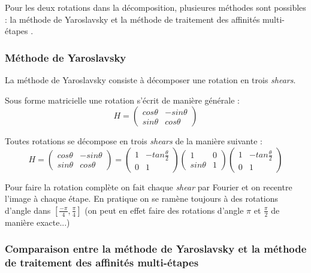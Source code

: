 
Pour les deux rotations dans la décomposition, plusieures méthodes sont possibles : la méthode de Yaroslavsky \cite{unser1995convolution} et la méthode de traitement des affinités multi-étapes \cite{szeliski2010high}.

\subsubsection{Méthode de Yaroslavsky}

La méthode de Yaroslavsky consiste à décomposer une rotation en trois \emph{shears}.

Sous forme matricielle une rotation s'écrit de manière générale :
\begin{equation*}
	H=\begin{pmatrix}
	cos \theta&-sin \theta\\sin \theta&cos \theta
	\end{pmatrix}
	\end{equation*}
\begin{prop}
Toutes rotations se décompose en trois \emph{shears} de la manière suivante :
\begin{equation*}
	H=\begin{pmatrix}
	cos \theta&-sin \theta\\sin \theta&cos \theta
	\end{pmatrix}=\begin{pmatrix}
	1&-tan \frac{\theta}{2}\\0&1
	\end{pmatrix}\begin{pmatrix}
	1&0\\sin \theta&1
	\end{pmatrix}\begin{pmatrix}
	1&-tan \frac{\theta}{2}\\0&1
	\end{pmatrix}
	\end{equation*}
\end{prop}

	Pour faire la rotation complète on fait chaque \emph{shear} par Fourier et on recentre l'image à chaque étape.
	En pratique on se ramène toujours à des rotations d'angle dans $[\frac{-\pi}{4},\frac{\pi}{4}]$ (on peut en effet faire des rotations d'angle $\pi$ et $\frac{\pi}{2}$ de manière exacte...)  


\subsubsection{Comparaison entre la méthode de Yaroslavsky et la méthode de traitement des affinités multi-étapes}

